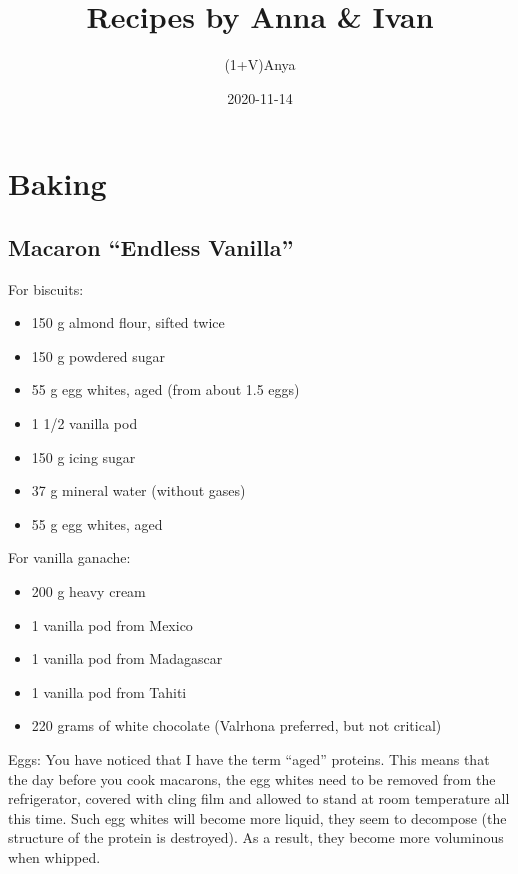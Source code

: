 \documentclass[
]{book}
\title{Recipes by Anna \& Ivan}
\author{(1+V)Anya}
\date{2020-11-14}
\providecommand{\tightlist}{%
  \setlength{\itemsep}{0pt}\setlength{\parskip}{0pt}}
\begin{document}
\maketitle

{
\setcounter{tocdepth}{1}
\tableofcontents
}
\hypertarget{baking}{%
\chapter{Baking}\label{baking}}

\hypertarget{macaron-endless-vanilla}{%
\section{Macaron ``Endless Vanilla''}\label{macaron-endless-vanilla}}

For biscuits:

\begin{itemize}
\tightlist
\item
  150 g almond flour, sifted twice
\item
  150 g powdered sugar
\item
  55 g egg whites, aged (from about 1.5 eggs)
\item
  1 1/2 vanilla pod
\item
  150 g icing sugar
\item
  37 g mineral water (without gases)
\item
  55 g egg whites, aged
\end{itemize}

For vanilla ganache:

\begin{itemize}
\tightlist
\item
  200 g heavy cream
\item
  1 vanilla pod from Mexico
\item
  1 vanilla pod from Madagascar
\item
  1 vanilla pod from Tahiti
\item
  220 grams of white chocolate (Valrhona preferred, but not critical)
\end{itemize}

Eggs:
You have noticed that I have the term ``aged'' proteins. This means that the day before you cook macarons, the egg whites need to be removed from the refrigerator, covered with cling film and allowed to stand at room temperature all this time. Such egg whites will become more liquid, they seem to decompose (the structure of the protein is destroyed). As a result, they become more voluminous when whipped.
\end{document}
